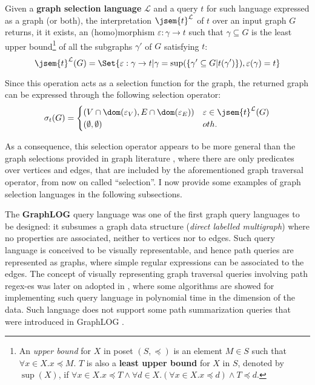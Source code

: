 \begin{definition}\label{def:travselect}
  Given a \textbf{graph selection language } $\mathcal{L}$ and a query $t$ for such language expressed as a graph (or both),
the interpretation $\jsem{t}^{\mathcal{L}}$ of $t$ over an input graph $G$ returns, it it exists, an (homo)morphism $\varepsilon:\gamma\to t$ such that $\gamma\subseteq G$ is the least upper bound\footnote{An \textit{upper bound} for $X$ in poset $(S,\preceq)$ is an element $M \in S$ such that $\forall x \in X. x \preceq M$. $T$ is also a \textbf{least upper bound} for $X$ in $S$, denoted by $\sup(X)$, if $\forall x\in X. x\preceq T\wedge \forall d\in X. (\forall x\in X. x\preceq d)\wedge T\preceq d$.} of all the subgraphs $\gamma'$ of $G$ satisfying $t$:
\[\jsem{t}^{\mathcal{L}}(G)=\Set{\varepsilon:\gamma\to t| \gamma = \sup(\{\gamma'\subseteq G|t(\gamma')\}), \varepsilon(\gamma)=t}\]

Since this operation acts as a selection function for the graph, the returned graph can be expressed through the following selection operator:
\[\sigma_t(G)=\begin{cases}
  (V\cap \dom(\varepsilon_V),E\cap \dom(\varepsilon_E)) & \varepsilon \in \jsem{t}^{\mathcal{L}}(G)\\
  (\emptyset,\emptyset) & oth.
\end{cases}\]
\end{definition}

As a consequence, this selection operator appears to be more general than the graph selections provided in graph literature \cite{apacheflink}, where there are only predicates over vertices and edges, that are included by the aforementioned graph traversal operator, from now on called ``selection''. I now provide some examples of graph selection languages in the following subsections.


The \textbf{GraphLOG} \cite{consens1990a} query language was one of the first graph query languages to be designed: it subsumes a graph
data structure (\textit{direct labelled multigraph})  where no properties are associated, neither to vertices
nor to edges. Such query language is conceived to be visually representable, and hence path queries are
represented as graphs, where simple regular expressions can be associated to the edges. The concept of
visually representing graph traversal queries involving path regex-es was later on adopted in \cite{n3},
where some algorithms are showed for implementing such query language in polynomial time in the dimension of the data. Such language
does not support some path summarization queries that were introduced in GraphLOG \cite{GraphLogAggr}.



